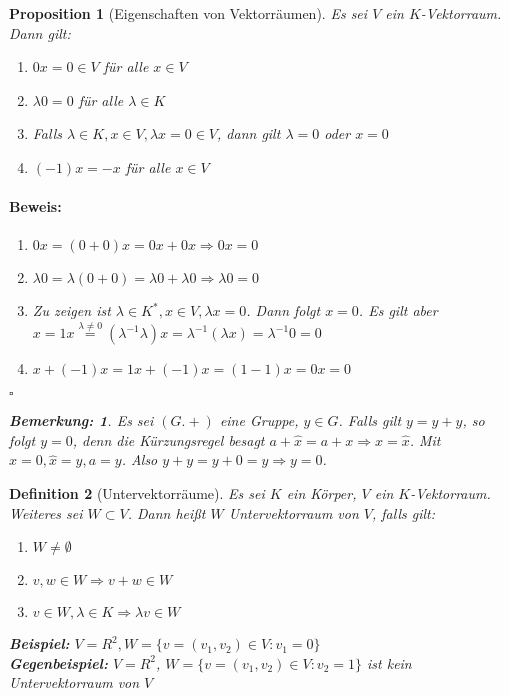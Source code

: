 \documentclass{report}
\newcommand{\IN}[1]{\index{#1|BH}}
\newcommand{\lb}{\lambda}
\theoremstyle{customrem}
\newtheorem*{bem}{Bemerkung:}
\theoremstyle{customdef}
\newtheorem{definition}{Definition}[chapter]
\newtheorem{prop}[definition]{Proposition}
\renewenvironment{proof}{\vspace{-.75cm}\paragraph{Beweis: }}{\vspace{-.5cm}\hfill$\square$}
\begin{document}
	\begin{prop}[Eigenschaften von Vektorräumen]
		Es sei $V$ ein $K$-Vektorraum. Dann gilt:
		\begin{enumerate}[leftmargin=4cm]
			\itemsep0cm
			\item $0 x = 0 \in V$ für alle $x \in V$
			\item $\lb 0 = 0$ für alle $\lb \in K$
			\item Falls $\lb \in K, x \in V, \lb x = 0 \in V$, dann gilt $\lb = 0$ oder $x = 0$
			\item $(-1) x = -x$ für alle $x \in V$
		\end{enumerate}
		\begin{proof}
			\begin{enumerate}
				\itemsep0cm
				\item $0 x = (0 + 0)x = 0x + 0x \Rightarrow 0x = 0$
				\item $\lb 0 = \lb(0 + 0) = \lb 0 + \lb 0 \Rightarrow \lb 0 = 0$
				\item Zu zeigen ist $\lb \in K^\ast, x \in V, \lb x = 0$. Dann folgt $x = 0$. Es gilt aber $x = 1 x \overset{\lb \neq 0}{=} (\lb ^{-1} \lb) x = \lb^{-1}(\lb x) = \lb^{-1} 0 = 0$
				\item $x + (-1) x = 1x + (-1) x = (1 - 1)  x = 0 x = 0$
			\end{enumerate}
		\end{proof}
		\begin{bem}
			Es sei $(G. +)$ eine Gruppe, $y \in G$. Falls gilt $y = y + y$, so folgt $y = 0$, denn die Kürzungsregel besagt $a + \hat{x} = a+x \Rightarrow x = \hat{x}$. Mit $x = 0, \hat{x} = y, a = y$. Also $y +y = y + 0 = y \Rightarrow y = 0$.
		\end{bem}
	\end{prop}

	\begin{definition}[Untervektorräume]
		\IN{Vektorraum!Unter-}
		Es sei $K$ ein Körper, $V$ ein $K$-Vektorraum. Weiteres sei $W \subset V$. Dann heißt $W$ Untervektorraum von $V$, falls gilt:
		
		\begin{enumerate}[leftmargin=4cm]
			\itemsep0cm
			\item $W \neq \emptyset$ 
			\item $v, w \in W \Rightarrow v + w \in W$
			\item $v \in W, \lb \in K \Rightarrow \lb v \in W$
		\end{enumerate}
		
		\noindent\textbf{Beispiel:}
		$V = R^2, W = \{v = (v_1, v_2) \in V : v_1 = 0\}$\\
		\textbf{Gegenbeispiel:}
		$V = R^2$, $W = \{v = (v_1, v_2) \in V : v_2 = 1\}$ ist kein Untervektorraum von $V$
	\end{definition}
	
\end{document}
